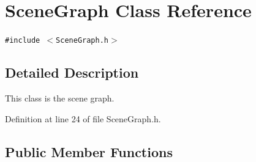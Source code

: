 \section{SceneGraph Class Reference}
\label{classSceneGraph}
{\tt \#include $<$SceneGraph.h$>$}



\subsection{Detailed Description}
This class is the scene graph. 

Definition at line 24 of file SceneGraph.h.\subsection*{Public Member Functions}
